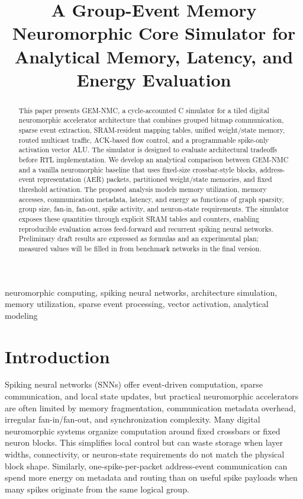 \documentclass[10pt,conference]{IEEEtran}
\title{A Group-Event Memory Neuromorphic Core Simulator for Analytical Memory, Latency, and Energy Evaluation}
\author{%
\IEEEauthorblockN{Author Name(s)}
\IEEEauthorblockA{Affiliation\\
Email}
}
\newcommand{\arch}{GEM-NMC}
\begin{document}
\maketitle

\begin{abstract}
This paper presents \arch{}, a cycle-accounted C simulator for a tiled digital neuromorphic accelerator architecture that combines grouped bitmap communication, sparse event extraction, SRAM-resident mapping tables, unified weight/state memory, routed multicast traffic, ACK-based flow control, and a programmable spike-only activation vector ALU. The simulator is designed to evaluate architectural tradeoffs before RTL implementation. We develop an analytical comparison between \arch{} and a vanilla neuromorphic baseline that uses fixed-size crossbar-style blocks, address-event representation (AER) packets, partitioned weight/state memories, and fixed threshold activation. The proposed analysis models memory utilization, memory accesses, communication metadata, latency, and energy as functions of graph sparsity, group size, fan-in, fan-out, spike activity, and neuron-state requirements. The simulator exposes these quantities through explicit SRAM tables and counters, enabling reproducible evaluation across feed-forward and recurrent spiking neural networks. Preliminary draft results are expressed as formulas and an experimental plan; measured values will be filled in from benchmark networks in the final version.
\end{abstract}

\begin{IEEEkeywords}
neuromorphic computing, spiking neural networks, architecture simulation, memory utilization, sparse event processing, vector activation, analytical modeling
\end{IEEEkeywords}

\section{Introduction}
Spiking neural networks (SNNs) offer event-driven computation, sparse communication, and local state updates, but practical neuromorphic accelerators are often limited by memory fragmentation, communication metadata overhead, irregular fan-in/fan-out, and synchronization complexity. Many digital neuromorphic systems organize computation around fixed crossbars or fixed neuron blocks. This simplifies local control but can waste storage when layer widths, connectivity, or neuron-state requirements do not match the physical block shape. Similarly, one-spike-per-packet address-event communication can spend more energy on metadata and routing than on useful spike payloads when many spikes originate from the same logical group.
\end{document}
